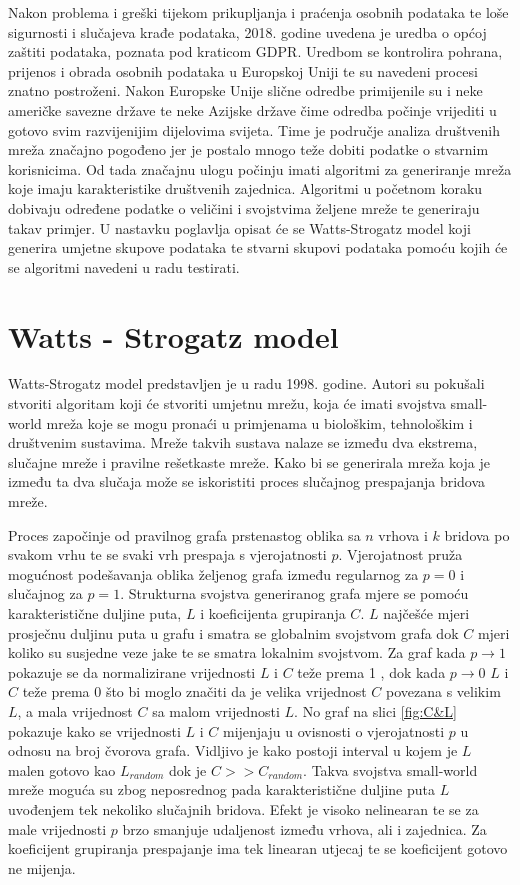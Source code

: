 Nakon problema i greški tijekom prikupljanja i praćenja osobnih podataka te loše sigurnosti i slučajeva krađe podataka, 2018. godine uvedena je uredba o općoj zaštiti podataka, poznata pod kraticom GDPR. Uredbom se kontrolira pohrana, prijenos i obrada osobnih podataka u Europskoj Uniji te su navedeni procesi znatno postroženi. Nakon Europske Unije slične odredbe primijenile su i neke američke savezne države te neke Azijske države čime odredba počinje vrijediti u gotovo svim razvijenijim dijelovima svijeta. Time je područje analiza društvenih mreža značajno pogođeno jer je postalo mnogo teže dobiti podatke o stvarnim korisnicima. Od tada značajnu ulogu počinju imati algoritmi za generiranje mreža koje imaju karakteristike društvenih zajednica. Algoritmi u početnom koraku dobivaju određene podatke o veličini i svojstvima željene mreže te generiraju takav primjer. U nastavku poglavlja opisat će se Watts-Strogatz model koji generira umjetne skupove podataka te stvarni skupovi podataka pomoću kojih će se algoritmi navedeni u radu testirati.



\section{Watts - Strogatz model}

Watts-Strogatz model predstavljen je u radu \cite{watts1998collective} 1998. godine. Autori su pokušali stvoriti algoritam koji će stvoriti umjetnu mrežu, koja će imati svojstva small-world mreža koje se mogu pronaći u primjenama u biološkim, tehnološkim i društvenim sustavima. Mreže takvih sustava nalaze se između dva ekstrema, slučajne mreže i pravilne rešetkaste mreže. Kako bi se generirala mreža koja je između ta dva slučaja može se iskoristiti proces slučajnog prespajanja bridova mreže. 

Proces započinje od pravilnog grafa prstenastog oblika sa $n$ vrhova i $k$ bridova po svakom vrhu te se svaki vrh prespaja s vjerojatnosti $p$. Vjerojatnost pruža mogućnost podešavanja oblika željenog grafa između regularnog za $p = 0$ i slučajnog za $p = 1$. Strukturna svojstva generiranog grafa mjere se pomoću karakteristične duljine puta, $L$ i koeficijenta grupiranja $C$. $L$ najčešće mjeri prosječnu duljinu puta u grafu i smatra se globalnim svojstvom grafa dok $C$ mjeri koliko su susjedne veze jake te se smatra lokalnim svojstvom. Za graf kada $p \rightarrow 1$ pokazuje se da normalizirane vrijednosti $L$ i $C$ teže prema 1 , dok kada $p \rightarrow 0$ $L$ i $C$ teže prema 0 što bi moglo značiti da je velika vrijednost $C$ povezana s velikim $L$, a mala vrijednost $C$ sa malom vrijednosti $L$. No graf na slici \ref{fig:C&L} pokazuje kako se vrijednosti $L$ i $C$ mijenjaju u ovisnosti o vjerojatnosti $p$ u odnosu na broj čvorova grafa. Vidljivo je kako postoji interval u kojem je $L$ malen gotovo kao $L_{random}$ dok je $C >> C_{random}$. Takva svojstva small-world mreže moguća su zbog neposrednog pada karakteristične duljine puta $L$ uvođenjem tek nekoliko slučajnih bridova. Efekt je visoko nelinearan te se za male vrijednosti $p$ brzo smanjuje udaljenost između vrhova, ali i zajednica. Za koeficijent grupiranja prespajanje ima tek linearan utjecaj te se koeficijent gotovo ne mijenja. 

